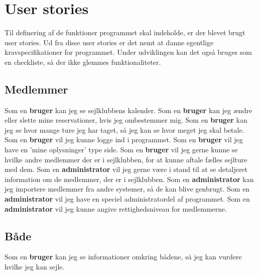 \chapter{User stories}\label{User_stories}
Til definering af de funktioner programmet skal indeholde, er der blevet brugt user stories.
Ud fra disse user stories er det nemt at danne egentlige kravspecifikationer for programmet. 
Under udviklingen kan det også bruges som en checkliste, så der ikke glemmes funktionaliteter. 

\section{Medlemmer}
Som en \textbf{bruger} kan jeg se sejlklubbens kalender.
\newline
Som en \textbf{bruger} kan jeg ændre eller slette mine reservationer, hvis jeg ombestemmer mig.
\newline
Som en \textbf{bruger} kan jeg se hvor mange ture jeg har taget, så jeg kan se hvor meget jeg skal betale.
\newline
Som en \textbf{bruger} vil jeg kunne logge ind i programmet.
\newline
Som en \textbf{bruger} vil jeg have en 'mine oplysninger' type side. 
\newline
Som en \textbf{bruger} vil jeg gerne kunne se hvilke andre medlemmer der er i sejlklubben, for at kunne aftale fælles sejlture med dem.
\newline
Som en \textbf{administrator} vil jeg gerne være i stand til at se detaljeret information om de medlemmer, der er i sejlklubben.
\newline
Som en \textbf{administrator} kan jeg importere medlemmer fra andre systemer, så de kan blive genbrugt.
\newline
Som en \textbf{administrator} vil jeg have en speciel administratordel af programmet.
\newline
Som en \textbf{administrator} vil jeg kunne angive rettighedsniveau for medlemmerne.

\section{Både}

Som en \textbf{bruger} kan jeg se informationer omkring bådene, så jeg kan vurdere hvilke jeg kan sejle. 

